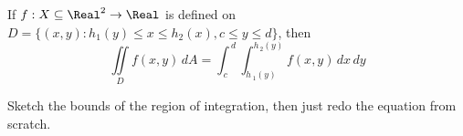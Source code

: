 \begin{theorem}
  If $f : X \subseteq \Real^2 \to \Real$ is defined on $D = \{ (x, y) : h_1(y) \leq x \leq h_2(x), c \leq y \leq d \}$, then
  \[
    \iint\limits_{D}{{f\left( {x,y} \right)\,dA}} = \int_{{\,c}}^{{\,d}}{{\int_{{h{\,_1}\left( y \right)}}^{{{h_{\,2}}\left( y \right)}}{{f\left( {x,y} \right)\,dx}}\,dy}}
  \]
\end{theorem}

\begin{theorem}
  Sketch the bounds of the region of integration, then just redo the equation from scratch.
\end{theorem}
